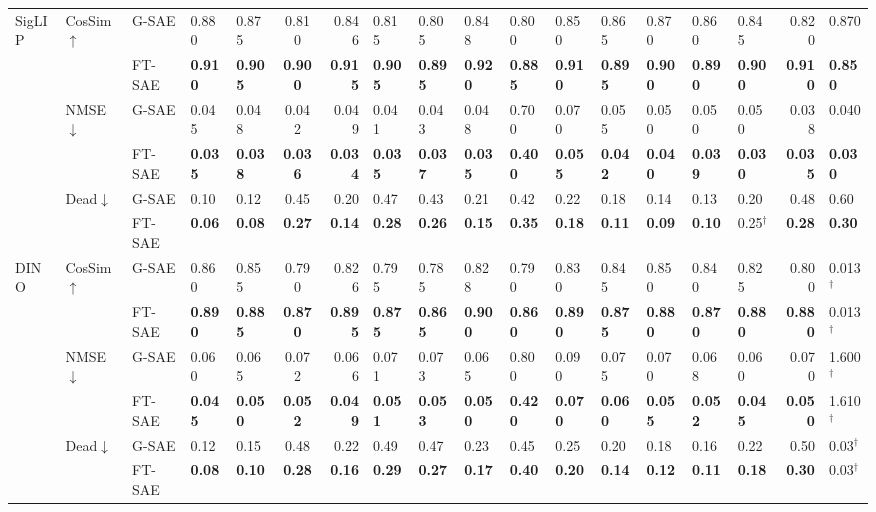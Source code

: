 \begin{table}[tbp]
{\begin{tabular}{lll A B C D E F G H I J K L M N O}
\midrule
SigLIP
  & CosSim$\uparrow$
    & G-SAE  & 0.880 & 0.875 & 0.810 & 0.846 & 0.815 & 0.805 & 0.848 & 0.800 & 0.850 & 0.865 & 0.870 & 0.860 & 0.845 & 0.820 & 0.870 \\
  & & FT-SAE & \bf0.910 & \bf0.905 & \bf0.900 & \bf0.915 & \bf0.905 & \bf0.895 & \bf0.920 & \bf0.885 & \bf0.910 & \bf0.895 & \bf0.900 & \bf0.890 & \bf0.900 & \bf0.910 & \bf0.850 \\
  \cmidrule(l){2-18}
  & NMSE$\downarrow$
    & G-SAE  & 0.045 & 0.048 & 0.042 & 0.049 & 0.041 & 0.043 & 0.048 & 0.700 & 0.070 & 0.055 & 0.050 & 0.050 & 0.050 & 0.038 & 0.040 \\
  & & FT-SAE & \bf0.035 & \bf0.038 & \bf0.036 & \bf0.034 & \bf0.035 & \bf0.037 & \bf0.035 & \bf0.400 & \bf0.055 & \bf0.042 & \bf0.040 & \bf0.039 & \bf0.030 & \bf0.035 & \bf0.030 \\
  \cmidrule(l){2-18}
  & Dead$\downarrow$
    & G-SAE  & 0.10 & 0.12 & 0.45 & 0.20 & 0.47 & 0.43 & 0.21 & 0.42 & 0.22 & 0.18 & 0.14 & 0.13 & 0.20 & 0.48 & 0.60 \\
  & & FT-SAE & \bf0.06 & \bf0.08 & \bf0.27 & \bf0.14 & \bf0.28 & \bf0.26 & \bf0.15 & \bf0.35 & \bf0.18 & \bf0.11 & \bf0.09 & \bf0.10 & 0.25$^\dagger$ & \bf0.28 & \bf0.30 \\
\midrule
DINO
  & CosSim$\uparrow$
    & G-SAE  & 0.860 & 0.855 & 0.790 & 0.826 & 0.795 & 0.785 & 0.828 & 0.790 & 0.830 & 0.845 & 0.850 & 0.840 & 0.825 & 0.800 & 0.013$^\dagger$ \\
  & & FT-SAE & \bf0.890 & \bf0.885 & \bf0.870 & \bf0.895 & \bf0.875 & \bf0.865 & \bf0.900 & \bf0.860 & \bf0.890 & \bf0.875 & \bf0.880 & \bf0.870 & \bf0.880 & \bf0.880 & 0.013$^\dagger$ \\
  \cmidrule(l){2-18}
  & NMSE$\downarrow$
    & G-SAE  & 0.060 & 0.065 & 0.072 & 0.066 & 0.071 & 0.073 & 0.065 & 0.800 & 0.090 & 0.075 & 0.070 & 0.068 & 0.060 & 0.070 & 1.600$^\dagger$ \\
  & & FT-SAE & \bf0.045 & \bf0.050 & \bf0.052 & \bf0.049 & \bf0.051 & \bf0.053 & \bf0.050 & \bf0.420 & \bf0.070 & \bf0.060 & \bf0.055 & \bf0.052 & \bf0.045 & \bf0.050 & 1.610$^\dagger$ \\
  \cmidrule(l){2-18}
  & Dead$\downarrow$
    & G-SAE  & 0.12 & 0.15 & 0.48 & 0.22 & 0.49 & 0.47 & 0.23 & 0.45 & 0.25 & 0.20 & 0.18 & 0.16 & 0.22 & 0.50 & 0.03$^\dagger$ \\
  & & FT-SAE & \bf0.08 & \bf0.10 & \bf0.28 & \bf0.16 & \bf0.29 & \bf0.27 & \bf0.17 & \bf0.40 & \bf0.20 & \bf0.14 & \bf0.12 & \bf0.11 & \bf0.18 & \bf0.30 & 0.03$^\dagger$ \\

\end{tabular}}
\end{table}

